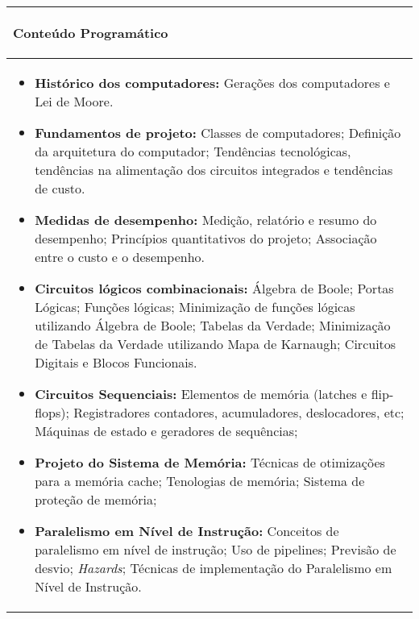 \hspace{1cm}
\begin{table}[h!]
\centering
\begin{small} 
\setlength{\tabcolsep}{3pt} 
\begin{tabular}{|p{15cm}|}\hline

\begin{center}\textbf{Conteúdo Programático}\end{center}\\ \hline
\begin{itemize}
 \item \textbf{Histórico dos computadores:} Gerações dos computadores e  Lei de Moore.
 \item \textbf{Fundamentos de projeto:} Classes de computadores; Definição da arquitetura do computador; Tendências tecnológicas, tendências na alimentação dos circuitos integrados e tendências de custo.
 \item \textbf{Medidas de desempenho:} Medição, relatório e resumo do desempenho; Princípios quantitativos do projeto; Associação entre o custo e o desempenho.
 \item \textbf{Circuitos lógicos combinacionais:} Álgebra de Boole; Portas Lógicas; Funções lógicas; Minimização de funções lógicas utilizando Álgebra de Boole; Tabelas da Verdade; Minimização de Tabelas da Verdade utilizando Mapa de Karnaugh;  Circuitos Digitais e Blocos Funcionais.
 \item \textbf{Circuitos Sequenciais:} Elementos de memória (latches e flip-flops); Registradores contadores, acumuladores, deslocadores, etc; Máquinas de estado e geradores de sequências; 
 \item \textbf{Projeto do Sistema de Memória:} Técnicas de otimizações para a memória cache; Tenologias de memória; Sistema de proteção de memória;
 \item \textbf{Paralelismo em Nível de Instrução:} Conceitos de paralelismo em nível de instrução; Uso de pipelines; Previsão de desvio; \textit{Hazards}; Técnicas de implementação do Paralelismo em Nível de Instrução. %
\end{itemize}
 \\ \hline

\end{tabular} 
\end{small}
\label{dadosinstituicao}
\end{table}


